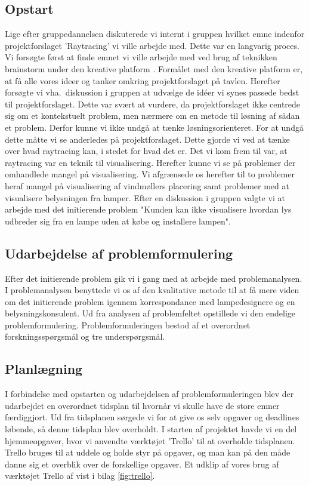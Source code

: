 \subsection{Opstart}

Lige efter gruppedannelsen diskuterede vi internt i gruppen hvilket emne indenfor projektforslaget 'Raytracing' vi ville arbejde med. Dette var en langvarig proces. Vi forsøgte først at finde emnet vi ville arbejde med ved brug af teknikken brainstorm under den kreative platform \cite{LASSE}. Formålet med den kreative platform er, at få alle vores ideer og tanker omkring projektforslaget på tavlen. Herefter forsøgte vi vha.\ diskussion i gruppen at udvælge de idéer vi synes passede bedst til projektforslaget. Dette var svært at vurdere, da projektforslaget ikke centrede sig om et kontekstuelt problem, men nærmere om en metode til løsning af sådan et problem. Derfor kunne vi ikke undgå at tænke løsningsorienteret. For at undgå dette måtte vi se anderledes på projektforslaget. Dette gjorde vi ved at tænke over hvad raytracing kan, i stedet for hvad det er. Det vi kom frem til var, at raytracing var en teknik til visualisering. Herefter kunne vi se på problemer der omhandlede mangel på visualisering. Vi afgrænsede os herefter til to problemer heraf mangel på visualisering af vindmøllers placering samt problemer med at visualisere belysningen fra lamper. Efter en diskussion i gruppen valgte vi at arbejde med det initierende problem "Kunden kan ikke visualisere hvordan lys udbreder sig fra en lampe uden at købe og installere lampen". 

\subsection{Udarbejdelse af problemformulering}
Efter det initierende problem gik vi i gang med at arbejde med problemanalysen. I problemanalysen benyttede vi os af den kvalitative metode til at få mere viden om det initierende problem igennem korrespondance med lampedesignere og en belysningskonsulent. Ud fra analysen af problemfeltet opstillede vi den endelige problemformulering. Problemformuleringen bestod af et overordnet forskningsspørgsmål og tre underspørgsmål.

\subsection{Planlægning}
I forbindelse med opstarten og udarbejdelsen af problemformuleringen blev der udarbejdet en overordnet tidsplan til hvornår vi skulle have de store emner færdiggjort. Ud fra tidsplanen sørgede vi for at give os selv opgaver og deadlines løbende, så denne tidsplan blev overholdt. I starten af projektet havde vi en del hjemmeopgaver, hvor vi anvendte værktøjet 'Trello' til at overholde tidsplanen. Trello bruges til at uddele og holde styr på opgaver, og man kan på den måde danne sig et overblik over de forskellige opgaver. Et udklip af vores brug af værktøjet Trello af vist i bilag \ref{fig:trello}. 
\newline

